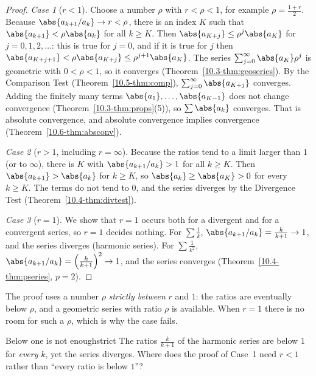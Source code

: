 \documentclass[11pt]{article}
\begin{document}
\begin{proof}
\emph{Case 1} ($r<1$). Choose a number $\rho$ with $r<\rho<1$, for example $\rho=\frac{1+r}2$. Because $\abs{a_{k+1}/a_k}\to r<\rho$, there is an index $K$ such that $\abs{a_{k+1}}<\rho\abs{a_k}$ for all $k\ge K$. Then $\abs{a_{K+j}}\le\rho^j\abs{a_K}$ for $j=0,1,2,\dots$: this is true for $j=0$, and if it is true for $j$ then $\abs{a_{K+j+1}}<\rho\abs{a_{K+j}}\le\rho^{j+1}\abs{a_K}$. The series $\sum_{j=0}^\infty\abs{a_K}\rho^j$ is geometric with $0<\rho<1$, so it converges (Theorem~\ref{10.3-thm:geoseries}). By the Comparison Test (Theorem~\ref{10.5-thm:comp}), $\sum_{j=0}^\infty\abs{a_{K+j}}$ converges. Adding the finitely many terms $\abs{a_1},\dots,\abs{a_{K-1}}$ does not change convergence (Theorem~\ref{10.3-thm:props}(5)), so $\sum\abs{a_k}$ converges. That is absolute convergence, and absolute convergence implies convergence (Theorem~\ref{10.6-thm:absconv}).

\emph{Case 2} ($r>1$, including $r=\infty$). Because the ratios tend to a limit larger than $1$ (or to $\infty$), there is $K$ with $\abs{a_{k+1}/a_k}>1$ for all $k\ge K$. Then $\abs{a_{k+1}}>\abs{a_k}$ for $k\ge K$, so $\abs{a_k}\ge\abs{a_K}>0$ for every $k\ge K$. The terms do not tend to $0$, and the series diverges by the Divergence Test (Theorem~\ref{10.4-thm:divtest}).

\emph{Case 3} ($r=1$). We show that $r=1$ occurs both for a divergent and for a convergent series, so $r=1$ decides nothing. For $\sum\frac1k$, $\abs{a_{k+1}/a_k}=\frac k{k+1}\to1$, and the series diverges (harmonic series). For $\sum\frac1{k^2}$, $\abs{a_{k+1}/a_k}=\left(\frac k{k+1}\right)^2\to1$, and the series converges (Theorem~\ref{10.4-thm:pseries}, $p=2$).
\end{proof}

The proof uses a number $\rho$ \emph{strictly between} $r$ and $1$: the ratios are eventually below $\rho$, and a geometric series with ratio $\rho$ is available. When $r=1$ there is no room for such a $\rho$, which is why the case fails.

\begin{think}{Below one is not enough}{strict}
The ratios $\frac k{k+1}$ of the harmonic series are below $1$ for \emph{every} $k$, yet the series diverges. Where does the proof of Case~1 need $r<1$ rather than ``every ratio is below $1$''?
\end{think}
\end{document}
